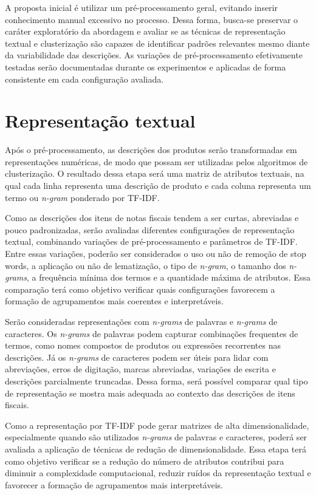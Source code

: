 \documentclass[english,brazilian]{UNISINOSmonografia}
\begin{document}
A proposta inicial é utilizar um pré-processamento geral, evitando inserir conhecimento manual excessivo no processo. Dessa forma, busca-se preservar o caráter exploratório da abordagem e avaliar se as técnicas de representação textual e clusterização são capazes de identificar padrões relevantes mesmo diante da variabilidade das descrições. As variações de pré-processamento efetivamente testadas serão documentadas durante os experimentos e aplicadas de forma consistente em cada configuração avaliada.


\section{Representação textual}

Após o pré-processamento, as descrições dos produtos serão transformadas em representações numéricas, de modo que possam ser utilizadas pelos algoritmos de clusterização. O resultado dessa etapa será uma matriz de atributos textuais, na qual cada linha representa uma descrição de produto e cada coluna representa um termo ou \textit{n-gram} ponderado por TF-IDF.

Como as descrições dos itens de notas fiscais tendem a ser curtas, abreviadas e pouco padronizadas, serão avaliadas diferentes configurações de representação textual, combinando variações de pré-processamento e parâmetros de TF-IDF. Entre essas variações, poderão ser considerados o uso ou não de remoção de stop words, a aplicação ou não de lematização, o tipo de \textit{n-gram}, o tamanho dos \textit{n-grams}, a frequência mínima dos termos e a quantidade máxima de atributos. Essa comparação terá como objetivo verificar quais configurações favorecem a formação de agrupamentos mais coerentes e interpretáveis.

Serão consideradas representações com \textit{n-grams} de palavras e \textit{n-grams} de caracteres. Os \textit{n-grams} de palavras podem capturar combinações frequentes de termos, como nomes compostos de produtos ou expressões recorrentes nas descrições. Já os \textit{n-grams} de caracteres podem ser úteis para lidar com abreviações, erros de digitação, marcas abreviadas, variações de escrita e descrições parcialmente truncadas. Dessa forma, será possível comparar qual tipo de representação se mostra mais adequada ao contexto das descrições de itens fiscais.

Como a representação por TF-IDF pode gerar matrizes de alta dimensionalidade, especialmente quando são utilizados \textit{n-grams} de palavras e caracteres, poderá ser avaliada a aplicação de técnicas de redução de dimensionalidade. Essa etapa terá como objetivo verificar se a redução do número de atributos contribui para diminuir a complexidade computacional, reduzir ruídos da representação textual e favorecer a formação de agrupamentos mais interpretáveis.
\end{document}
